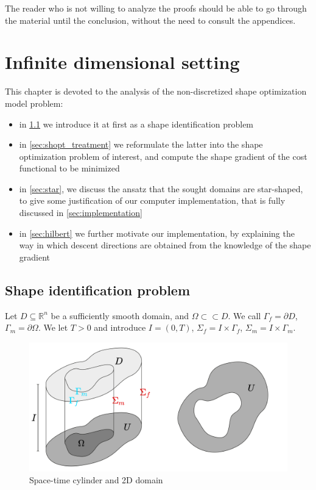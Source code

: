 \documentclass[english,a4paper,9pt,oneside]{scrbook}	%
\theoremstyle{break}
\theoremstyle{remark}
\newcommand{\mR}{\mathbb{R}}
\newcommand{\cc}{\subset\subset}
\begin{document}
The reader who is not willing to analyze the proofs should be able to go through the material until the conclusion, without the need to consult the appendices.

\chapter{Infinite dimensional setting}
\label{chap:cts_shape_opt}

This chapter is devoted to the analysis of the non-discretized shape optimization model problem:

\begin{itemize}
	\item in \cref{sec:shid} we introduce it at first as a shape identification problem
	\item in \cref{sec:shopt_treatment} we reformulate the latter into the shape optimization problem of interest, and compute the shape gradient of the cost functional to be minimized
	\item in \cref{sec:star}, we discuss the ansatz that the sought domains are star-shaped, to give some justification of our computer implementation, that is fully discussed in \cref{sec:implementation}
	\item in \cref{sec:hilbert} we further motivate our implementation, by explaining the way in which descent directions are obtained from the knowledge of the shape gradient
\end{itemize}

\section{Shape identification problem}
\label{sec:shid}

Let $D\subseteq\mR^n$ be a sufficiently smooth domain, and $\Omega \cc D$. We call $\Gamma_f=\partial D$, $\Gamma_m = \partial \Omega$. We let $T>0$ and introduce $I = (0,T)$, $\Sigma_f=I\times \Gamma_f$, $\Sigma_m=I\times \Gamma_m$.

\begin{figure}[H]
\centering
\includegraphics[height=0.25\columnwidth]{Images/Domains.pdf}
\caption{Space-time cylinder and 2D domain}\label{fig:space_time}
\end{figure}
\end{document}
